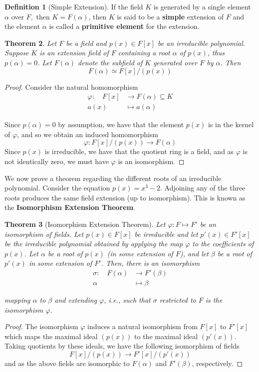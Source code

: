 \documentclass[10pt, oneside, reqno]{amsart}
\theoremstyle{plain}%
\newtheorem{thm}{Theorem}[section]
\theoremstyle{definition}
\newtheorem{defn}[thm]{Definition}
\theoremstyle{remark}
\newcommand{\al}{\alpha}
\newcommand{\mapping}[5]{\begin{align*}
	#1 : \quad     #2 &\rightarrow #3 \\
			#4  &\mapsto #5
\end{align*}	
}
\begin{document}
\begin{defn}[Simple Extension]
	If the field $K$ is generated by a single element $\al$ over $F,$ then $K = F(\al)$, then $K$ is said to be a \textbf{simple} extension of $F$ and the element $\al$ is called a \textbf{primitive element} for the extension.
\end{defn}

\begin{thm}
	Let $F$ be a field and $p(x) \in F[x]$ be an irreducible polynomial. Suppose $K$ is an extension field of $F$ containing a root $\al$ of $p(x)$, thus $p(\al) = 0$.  Let $F(\al)$ denote the subfield of $K$ generated over $F$ by $\al$.  Then \[
		F(\al) \simeq F[x]/(p(x))
	\]
\end{thm}
\begin{proof}
	Consider the natural homomorphism
	\mapping{\varphi}{F[x]}{F(\alpha) \subseteq K}{a(x)}{a(\alpha)}
	Since $p(\alpha) = 0$ by assumption, we have that the element $p(x)$ is in the kernel of $\varphi$, and so we obtain an induced homomorphism \[
		\varphi : F[x]/(p(x)) \rightarrow F(\al)
	\]
	Since $p(x)$ is irreducible, we have that the quotient ring is a field, and as $\varphi$ is not identically zero, we must have $\varphi$ is an isomorphism.
\end{proof}


We now prove a theorem regarding the different roots of an irreducible polynomial.  Consider the equation $p(x) = x^3 - 2$.  Adjoining any of the three roots produces the same field extension (up to isomorphism).    This is known as the \textbf{Isomorphism Extension Theorem}.   

\begin{thm}[Isomorphism Extension Theorem]
	Let $\varphi : F \mapsto F'$ be an isomorphism of fields.  Let $p(x) \in F[x]$ be irreducible and let $p'(x) \in F'[x]$ be the irreducible polynomial obtained by applying the map $\varphi$ to the coefficients of $p(x)$.  Let $\alpha$ be a root of $p(x)$ (in some extension of $F$), and let $\beta$ be a root of $p'(x)$ in some extension of $F'$.  Then, there is an isomorphism
	\mapping{\sigma}{F(\alpha)}{F'(\beta)}{\alpha}{\beta}
	mapping $\alpha$ to $\beta$ and extending $\varphi$, i.e., such that $\sigma$ restricted to $F$ is the isomorphism $\varphi$.
\end{thm}
\begin{proof}
	The isomorphism $\varphi$ induces a natural isomorphism from $F[x]$ to $F'[x]$ which maps the maximal ideal $(p(x))$ to the maximal ideal $(p'(x))$.  Taking quotients by these ideals, we have the following isomorphism of fields\[
		F[x]/(p(x)) \rightarrow F'[x]/(p'(x))
	\]
	and as the above fields are isomorphic to $F(\alpha)$ and $F'(\beta)$, respectively.
\end{proof}
\end{document}
